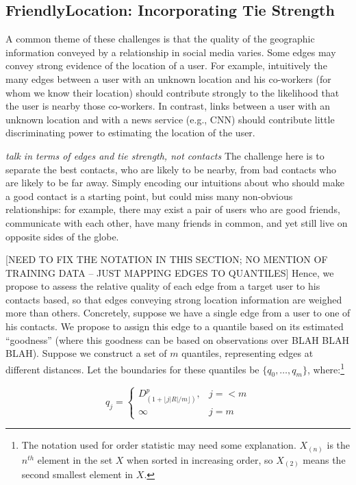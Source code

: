 \documentclass[letterpaper]{article}
\newcommand{\jam}[1]{\emph{#1}}
\begin{document}
\subsection{FriendlyLocation: Incorporating Tie Strength}
A common theme of these challenges is that the quality of the geographic information conveyed by a relationship in social media varies. Some edges may convey strong evidence of the location of a user. For example, intuitively the many edges between a user with an unknown location and his co-workers (for whom we know their location) should contribute strongly to the likelihood that the user is nearby those co-workers. In contrast, links between a user with an unknown location and with a news service (e.g., CNN) should contribute little discriminating power to estimating the location of the user.

\jam{talk in terms of edges and tie strength, not contacts}
The challenge here is to separate the best contacts, who are likely to be nearby, from bad contacts who are likely to be far away. Simply encoding our intuitions about who should make a good contact is a starting point, but could miss many non-obvious relationships: for example, there may exist a pair of users who are good friends, communicate with each other, have many friends in common, and yet still live on opposite sides of the globe. 

[NEED TO FIX THE NOTATION IN THIS SECTION; NO MENTION OF TRAINING DATA -- JUST MAPPING EDGES TO QUANTILES]
Hence, we propose to assess the relative quality of each edge from a target user to his contacts based, so that edges conveying strong location information are weighed more than others. Concretely, suppose we have a single edge from a user to one of his contacts. We propose to assign this edge to a quantile based on its estimated ``goodness'' (where this goodness can be based on observations over BLAH BLAH BLAH). Suppose we construct a set of $m$ quantiles, representing edges at different distances. Let the boundaries for these quantiles be  $\{q_0,\dots,q_m\}$, where:\footnote{The notation used for order statistic may need some explanation.  $X_{(n)}$ is the $n^{th}$ element in the set $X$ when sorted in increasing order, so $X_{(2)}$ means the second smallest element in $X$.}

\[
    q_j =
    \begin{cases}
        D^p_{(1+\lfloor j|R|/m \rfloor)}, & j=<m \\
        \infty & j=m
    \end{cases}
\]
\end{document}
